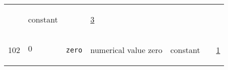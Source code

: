 \begin{longtable}{|p{1cm}|p{2.5cm}|p{4.5cm}|p{8cm}|p{3.0cm}|p{3cm}|p{1cm}|}
             & \begin{lay}constant \end{lay}
             & $  $
             &                 \hyperlink{"e:3"}{ 3 }
                 \\
            102
             & \hypertarget{"v:102"}{ $ {0}{_{}} $}
             & \verb|zero|
             & numerical value zero
             & \begin{lay}constant \end{lay}
             & $  $
             &                 \hyperlink{"e:1"}{ 1 }
                 \\
    \end{longtable}